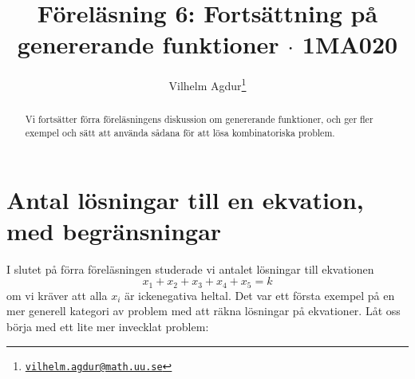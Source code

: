 \documentclass[nobib]{tufte-handout}
\title{Föreläsning 6: Fortsättning på genererande funktioner $\cdot$ 1MA020}
\author[Vilhelm Agdur]{Vilhelm Agdur\thanks{\href{mailto:vilhelm.agdur@math.uu.se}{\nolinkurl{vilhelm.agdur@math.uu.se}}}}
\begin{document}

\maketitle%

\begin{abstract}
\noindent
Vi fortsätter förra föreläsningens diskussion om genererande funktioner, och ger fler exempel och sätt att använda sådana för att lösa kombinatoriska problem.
\end{abstract}

\section{Antal lösningar till en ekvation, med begränsningar}

I slutet på förra föreläsningen studerade vi antalet lösningar till ekvationen
$$x_1 + x_2 + x_3 + x_4 + x_5 = k$$
om vi kräver att alla $x_i$ är ickenegativa heltal. Det var ett första exempel på en mer generell kategori av problem med att räkna lösningar på ekvationer. Låt oss börja med ett lite mer invecklat problem:
\end{document}
